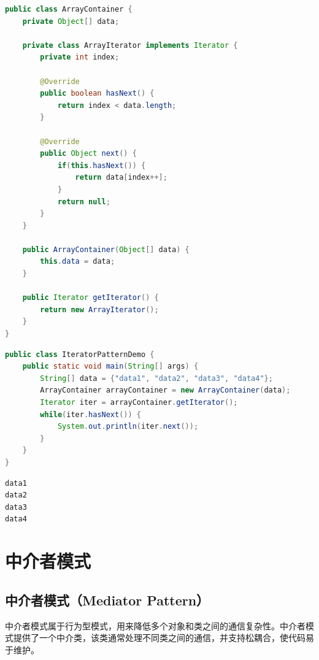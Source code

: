 \begin{lstlisting}[language=Java, title=ArrayContainer.java]
public class ArrayContainer {
    private Object[] data;

    private class ArrayIterator implements Iterator {
        private int index;

        @Override
        public boolean hasNext() {
            return index < data.length;
        }

        @Override
        public Object next() {
            if(this.hasNext()) {
                return data[index++];
            }
            return null;
        }
    }

    public ArrayContainer(Object[] data) {
        this.data = data;
    }

    public Iterator getIterator() {
        return new ArrayIterator();
    }
}
\end{lstlisting}

\begin{lstlisting}[language=Java, title=IteratorPatternDemo.java]
public class IteratorPatternDemo {
    public static void main(String[] args) {
        String[] data = {"data1", "data2", "data3", "data4"};
        ArrayContainer arrayContainer = new ArrayContainer(data);
        Iterator iter = arrayContainer.getIterator();
        while(iter.hasNext()) {
            System.out.println(iter.next());
        }
    }
}
\end{lstlisting}

\begin{tcolorbox}
    \begin{verbatim}
data1
data2
data3
data4
\end{verbatim}
\end{tcolorbox}

\newpage

\section{中介者模式}

\subsection{中介者模式（Mediator Pattern）}

中介者模式属于行为型模式，用来降低多个对象和类之间的通信复杂性。中介者模式提供了一个中介类，该类通常处理不同类之间的通信，并支持松耦合，使代码易于维护。\\

